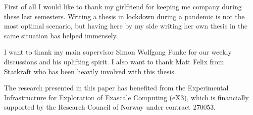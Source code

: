 First of all I would like to thank my girlfriend for keeping me company during these 
last semesters. Writing a thesis in lockdown during a pandemic is not the most optimal 
scenario, but having here by my side writing her own thesis in the same situation 
has helped immensely. 

I want to thank my main supervisor Simon Wolfgang Funke for our weekly discussions and his 
uplifting spirit. I also want to thank Matt Felix from Statkraft who has been 
heavily involved with this thesis.

The research presented in this paper has benefited from the Experimental Infrastructure for Exploration of Exascale Computing (eX3), which is financially supported by the Research Council of Norway under contract 270053.
